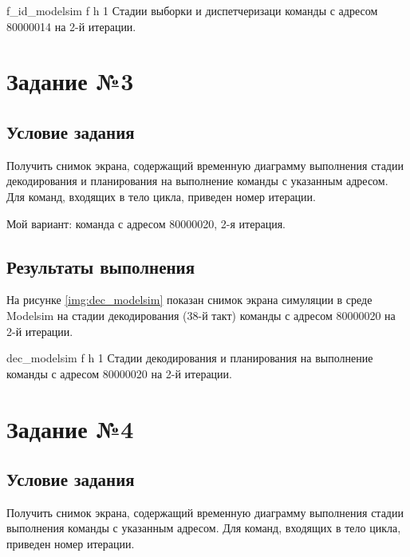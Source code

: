 {f_id_modelsim} %
{f} %
{h} %
{1\textwidth} %
{Стадии выборки и диспетчеризаци команды с адресом 80000014 на 2-й итерации.} %

\clearpage

\section{Задание №3}

\subsection*{Условие задания}
Получить снимок экрана, содержащий
временную диаграмму выполнения стадии декодирования и планирования на выполнение
команды с указанным адресом. Для команд, входящих в тело цикла, приведен номер итерации.

Мой вариант: команда  с адресом 80000020, 2-я итерация.

\subsection*{Результаты выполнения}

На рисунке \ref{img:dec_modelsim}  показан снимок экрана симуляции в среде Modelsim на стадии декодирования (38-й такт) команды с адресом 80000020 на 2-й итерации.

{dec_modelsim} %
{f} %
{h} %
{1\textwidth} %
{Стадии декодирования и планирования на выполнение команды с адресом 80000020 на 2-й итерации.} %

\clearpage 

\section{Задание №4}

\subsection*{Условие задания}

Получить снимок экрана, содержащий временную диаграмму выполнения стадии выполнения команды с указанным адресом. Для команд, входящих в тело цикла, приведен номер итерации.

